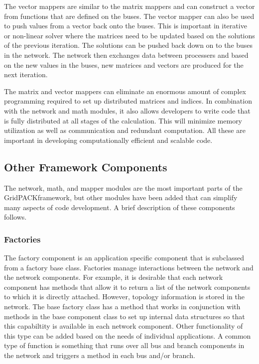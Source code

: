 \documentclass{acm_proc_article-sp}
\begin{document}
The vector mappers are similar to the matrix mappers and can
construct a vector from functions
that are defined on the buses. The vector mapper can also be used to push values
from a vector back onto the buses. This is important in iterative or non-linear
solver where the matrices need to be updated based on the solutions of the
previous iteration. The solutions can be pushed back down on to the buses in the
network. The network then exchanges data between processers and based on the new
values in the buses, new matrices and vectors are produced for the next
iteration.

The matrix and vector mappers can eliminate an enormous amount of complex
programming required to set up distributed matrices and indices. In combination
with the network and math modules, it also allows developers to write code that
is fully distributed at all stages of the calculation. This will minimize memory
utilization as well as communication and redundant computation. All these are
important in developing computationally efficient and scalable code.

\subsection{Other Framework Components}
The network, math, and mapper modules are the most important parts of the
GridPACK\texttrademark framework, but other modules have been added that can
simplify many aspects of code development. A brief description of these
components follows.

\subsubsection{Factories}
The factory component is an application specific component that is subclassed
from a factory base class. Factories manage interactions between the network and
the network components. For example, it is desirable that each network component has
methods that allow it to return a list of the network components to which it is
directly attached. However, topology information is stored in the network. The
base factory class has a method that works in conjunction with methods in the base
component class to set up internal data structures so that this capabiltity is
available in each network component. Other functionality of this type can be
added based on the needs of individual applications. A common type of function
is something that runs over all bus and branch components in the network and
triggers a method in each bus and/or branch.
\end{document}
